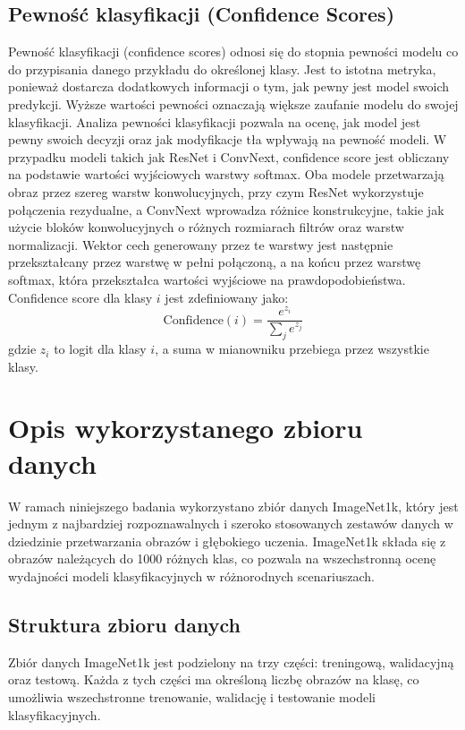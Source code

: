 \subsection*{Pewność klasyfikacji (Confidence Scores)}
Pewność klasyfikacji (confidence scores) odnosi się do stopnia pewności modelu co do przypisania danego przykładu do określonej klasy. Jest to istotna metryka, ponieważ dostarcza dodatkowych informacji o tym, jak pewny jest model swoich predykcji. Wyższe wartości pewności oznaczają większe zaufanie modelu do swojej klasyfikacji. Analiza pewności klasyfikacji pozwala na ocenę, jak model jest pewny swoich decyzji oraz jak modyfikacje tła wpływają na pewność modeli. W przypadku modeli takich jak ResNet i ConvNext, confidence score jest obliczany na podstawie wartości wyjściowych warstwy softmax. Oba modele przetwarzają obraz przez szereg warstw konwolucyjnych, przy czym ResNet wykorzystuje połączenia rezydualne, a ConvNext wprowadza różnice konstrukcyjne, takie jak użycie bloków konwolucyjnych o różnych rozmiarach filtrów oraz warstw normalizacji. Wektor cech generowany przez te warstwy jest następnie przekształcany przez warstwę w pełni połączoną, a na końcu przez warstwę softmax, która przekształca wartości wyjściowe na prawdopodobieństwa. Confidence score dla klasy \(i\) jest zdefiniowany jako:
\begin{equation}
\text{Confidence}(i) = \frac{e^{z_i}}{\sum_{j} e^{z_j}}
\end{equation}
gdzie \(z_i\) to logit dla klasy \(i\), a suma w mianowniku przebiega przez wszystkie klasy.


\section*{Opis wykorzystanego zbioru danych}

W ramach niniejszego badania wykorzystano zbiór danych ImageNet1k, który jest jednym z najbardziej rozpoznawalnych i szeroko stosowanych zestawów danych w dziedzinie przetwarzania obrazów i głębokiego uczenia. ImageNet1k składa się z 
obrazów należących do 1000 różnych klas, co pozwala na wszechstronną ocenę wydajności modeli klasyfikacyjnych w różnorodnych scenariuszach.

\subsection*{Struktura zbioru danych}

Zbiór danych ImageNet1k jest podzielony na trzy części: treningową, walidacyjną oraz testową. Każda z tych części ma określoną liczbę obrazów na klasę, co umożliwia wszechstronne trenowanie, walidację i testowanie modeli klasyfikacyjnych.

